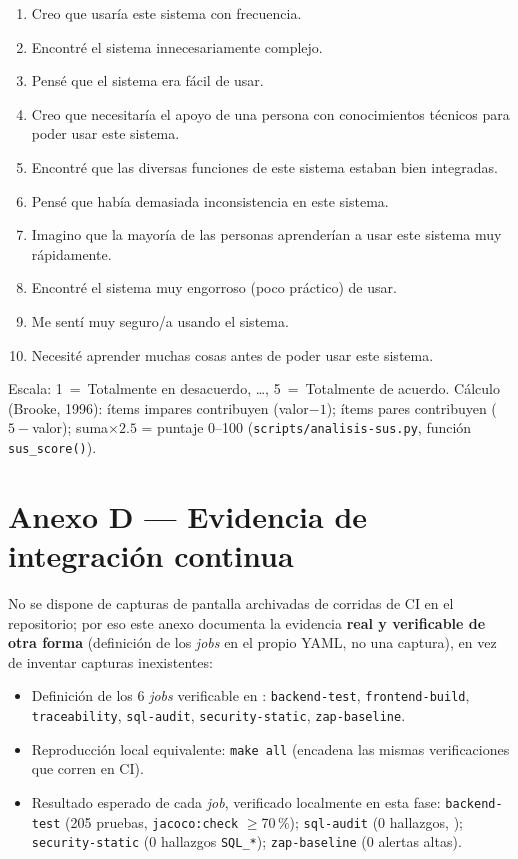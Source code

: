 \begin{enumerate}[nosep]
  \item Creo que usar\'ia este sistema con frecuencia.
  \item Encontr\'e el sistema innecesariamente complejo.
  \item Pens\'e que el sistema era f\'acil de usar.
  \item Creo que necesitar\'ia el apoyo de una persona con conocimientos
    t\'ecnicos para poder usar este sistema.
  \item Encontr\'e que las diversas funciones de este sistema estaban bien
    integradas.
  \item Pens\'e que hab\'ia demasiada inconsistencia en este sistema.
  \item Imagino que la mayor\'ia de las personas aprender\'ian a usar este
    sistema muy r\'apidamente.
  \item Encontr\'e el sistema muy engorroso (poco pr\'actico) de usar.
  \item Me sent\'i muy seguro/a usando el sistema.
  \item Necesit\'e aprender muchas cosas antes de poder usar este sistema.
\end{enumerate}

Escala: 1~=~Totalmente en desacuerdo, \ldots, 5~=~Totalmente de acuerdo.
C\'alculo (Brooke, 1996): \'items impares contribuyen (valor$-1$); \'items
pares contribuyen ($5-$valor); suma$\times 2.5$ = puntaje 0--100
(\texttt{scripts/analisis-sus.py}, funci\'on \texttt{sus\_score()}).

\section{Anexo D --- Evidencia de integraci\'on continua}
\label{sec:anexo-ci}

No se dispone de capturas de pantalla archivadas de corridas de CI en el
repositorio; por eso este anexo documenta la evidencia \textbf{real y
verificable de otra forma} (definici\'on de los \emph{jobs} en el propio
YAML, no una captura), en vez de inventar capturas inexistentes:

\begin{itemize}[nosep]
  \item Definici\'on de los 6 \emph{jobs} verificable en
    : \texttt{backend-test},
    \texttt{frontend-build}, \texttt{traceability}, \texttt{sql-audit},
    \texttt{security-static}, \texttt{zap-baseline}.
  \item Reproducci\'on local equivalente: \texttt{make all} (encadena las
    mismas verificaciones que corren en CI).
  \item Resultado esperado de cada \emph{job}, verificado localmente en
    esta fase: \texttt{backend-test} (205 pruebas, \texttt{jacoco:check}
    $\geq$70\,\%); \texttt{sql-audit} (0 hallazgos,
    ); \texttt{security-static}
    (0 hallazgos \texttt{SQL\_*}); \texttt{zap-baseline} (0 alertas altas).
\end{itemize}

